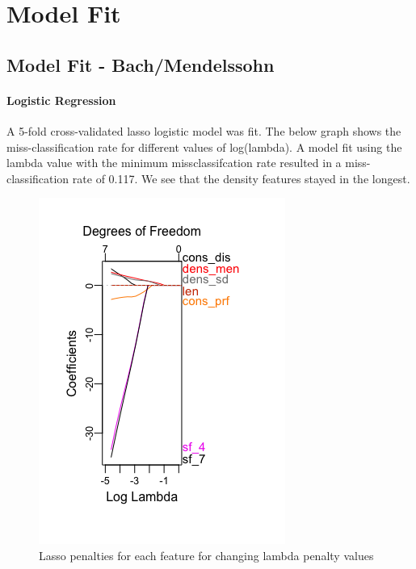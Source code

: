 \documentclass[12pt,twoside]{reedthesis}
\theoremstyle{definition}
\theoremstyle{definition}
\theoremstyle{definition}
\theoremstyle{remark}
\begin{document}
\chapter{Model Fit}\label{model-fit}

\section{Model Fit -
Bach/Mendelssohn}\label{model-fit---bachmendelssohn}

\subsubsection{Logistic Regression}\label{logistic-regression-1}

A 5-fold cross-validated lasso logistic model was fit. The below graph
shows the miss-classification rate for different values of log(lambda).
A model fit using the lambda value with the minimum missclassifcation
rate resulted in a miss-classification rate of 0.117. We see that the
density features stayed in the longest.
\begin{figure}[h]
\centering
\includegraphics[scale = .5]{images/lasso_bach.png}
\caption{Lasso penalties for each feature for changing lambda penalty values}
\label{subd}
\end{figure}
\end{document}
